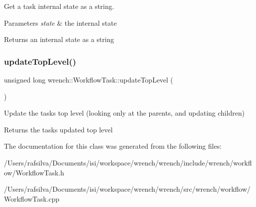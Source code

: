 Get a task internal state as a string. 


\begin{DoxyParams}{Parameters}
{\em state} & the internal state\\
\hline
\end{DoxyParams}
\begin{DoxyReturn}{Returns}
an internal state as a string 
\end{DoxyReturn}
\mbox{\label{classwrench_1_1_workflow_task_afe6505deda397a0c54a5326941cdd79d}} 
\subsubsection{\texorpdfstring{update\+Top\+Level()}{updateTopLevel()}}
{\footnotesize\ttfamily unsigned long wrench\+::\+Workflow\+Task\+::update\+Top\+Level (\begin{DoxyParamCaption}{ }\end{DoxyParamCaption})}



Update the task\textquotesingle{}s top level (looking only at the parents, and updating children) 

\begin{DoxyReturn}{Returns}
the task\textquotesingle{}s updated top level 
\end{DoxyReturn}


The documentation for this class was generated from the following files\+:\begin{DoxyCompactItemize}
\item 
/\+Users/rafsilva/\+Documents/isi/workspace/wrench/wrench/include/wrench/workflow/Workflow\+Task.\+h\item 
/\+Users/rafsilva/\+Documents/isi/workspace/wrench/wrench/src/wrench/workflow/Workflow\+Task.\+cpp\end{DoxyCompactItemize}
